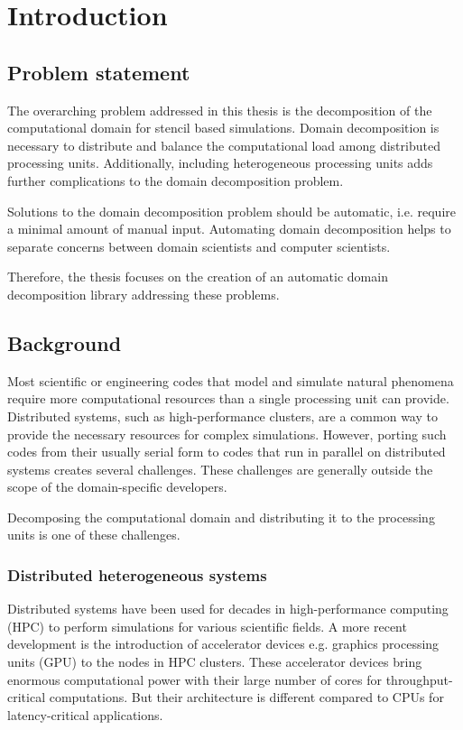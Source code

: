 \section{Introduction}
\subsection{Problem statement}
The overarching problem addressed in this thesis is the decomposition of the computational domain for stencil based simulations.
Domain decomposition is necessary to distribute and balance the computational load among distributed processing units.
Additionally, including heterogeneous processing units adds further complications to the domain decomposition problem.

Solutions to the domain decomposition problem should be automatic, i.e. require a minimal amount of manual input.
Automating domain decomposition helps to separate concerns between domain scientists and computer scientists.

Therefore, the thesis focuses on the creation of an automatic domain decomposition library addressing these problems.

\subsection{Background}
Most scientific or engineering codes that model and simulate natural phenomena require more computational resources than a single processing unit can provide.
Distributed systems, such as high-performance clusters, are a common way to provide the necessary resources for complex simulations.
However, porting such codes from their usually serial form to codes that run in parallel on distributed systems creates several challenges.
These challenges are generally outside the scope of the domain-specific developers.

Decomposing the computational domain and distributing it to the processing units is one of these challenges.

\subsubsection{Distributed heterogeneous systems}
Distributed systems have been used for decades in high-performance computing (HPC) to perform simulations for various scientific fields.
A more recent development is the introduction of accelerator devices e.g. graphics processing units (GPU) to the nodes in HPC clusters.
These accelerator devices bring enormous computational power with their large number of cores for throughput-critical computations.
But their architecture is different compared to CPUs for latency-critical applications.


